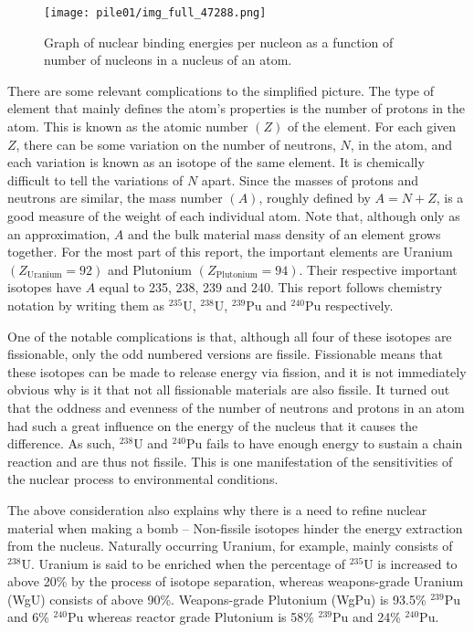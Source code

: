 \documentclass[twoside,titlepage,11pt,twocolumn,a4paper]{article}
\begin{document}
\begin{figure}
  \texttt{[image: pile01/img\_full\_47288.png]}
  \caption{Graph of nuclear binding energies per nucleon as a function
    of number of nucleons in a nucleus of an
    atom. \citep{iopBindingE}}
  \label{nuclearBindingEnergyBowl}
\end{figure}

There are some relevant complications to the simplified picture. The
type of element that mainly defines the atom's properties is the
number of protons in the atom. This is known as the atomic number \(
\left ( Z \right ) \) of the element. For each given \(Z\), there can
be some variation on the number of neutrons, \(N\), in the atom, and
each variation is known as an isotope of the same element. It is
chemically difficult to tell the variations of \(N\) apart. Since the
masses of protons and neutrons are similar, the mass number \( \left (
A \right ) \), roughly defined by \(A=N+Z\), is a good measure of the
weight of each individual atom. Note that, although only as an
approximation, \(A\) and the bulk material mass density of an element
grows together. For the most part of this report, the important
elements are Uranium \( \left ( Z_{\textrm{Uranium}} = 92 \right ) \)
and Plutonium \( \left ( Z_{\textrm{Plutonium}} = 94 \right )
\). Their respective important isotopes have \(A\) equal to 235, 238,
239 and 240. This report follows chemistry notation by writing them as
\( \mathrm{^{235}U} \), \( \mathrm{^{238}U} \), \( \mathrm{^{239}Pu}
\) and \( \mathrm{^{240}Pu} \) respectively.

One of the notable complications is that, although all four of these
isotopes are fissionable, only the odd numbered versions are
fissile. Fissionable means that these isotopes can be made to release
energy via fission, and it is not immediately obvious why is it that
not all fissionable materials are also fissile. It turned out that the
oddness and evenness of the number of neutrons and protons in an atom
had such a great influence on the energy of the nucleus that it causes
the difference. As such, \( \mathrm{^{238}U} \) and \(
\mathrm{^{240}Pu} \) fails to have enough energy to sustain a chain
reaction and are thus not fissile. This is one manifestation of the
sensitivities of the nuclear process to environmental conditions.

The above consideration also explains why there is a need to refine
nuclear material when making a bomb -- Non-fissile isotopes hinder the
energy extraction from the nucleus. Naturally occurring Uranium, for
example, mainly consists of \( \mathrm{^{238}U} \).  Uranium is said
to be enriched when the percentage of \( \mathrm{^{235}U} \) is
increased to above 20\% by the process of isotope separation, whereas
weapons-grade Uranium (WgU) consists of above
90\%. \citep{blackmarket} Weapons-grade Plutonium (WgPu) is 93.5\% \(
\mathrm{^{239}Pu} \) and 6\% \( \mathrm{^{240}Pu} \) whereas reactor
grade Plutonium is 58\% \( \mathrm{^{239}Pu} \) and 24\% \(
\mathrm{^{240}Pu} \). \citep{drell1993}
\end{document}
